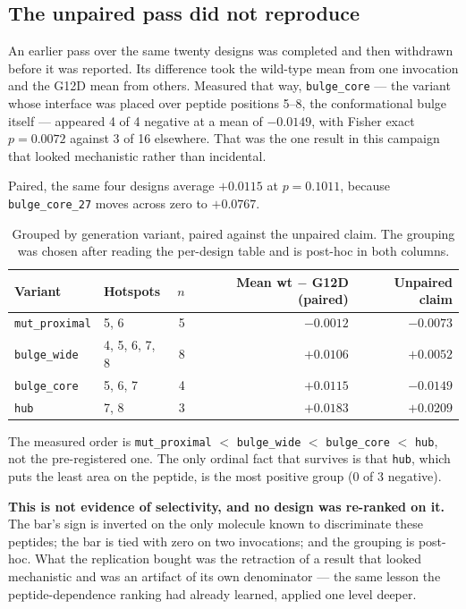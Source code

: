 \documentclass[11pt,a4paper]{article}
\begin{document}
\subsection*{The unpaired pass did not reproduce}

An earlier pass over the same twenty designs was completed and then withdrawn before it was
reported. Its difference took the wild-type mean from one invocation and the G12D mean from
others. Measured that way, \texttt{bulge\_core} --- the variant whose interface was placed over
peptide positions 5--8, the conformational bulge itself --- appeared 4 of 4 negative at a mean of
$-0.0149$, with Fisher exact $p = 0.0072$ against 3 of 16 elsewhere. That was the one result in
this campaign that looked mechanistic rather than incidental.

Paired, the same four designs average $+0.0115$ at $p = 0.1011$, because \texttt{bulge\_core\_27}
moves across zero to $+0.0767$.

\begin{table}[h]
\centering
\caption{Grouped by generation variant, paired against the unpaired claim. The grouping was
chosen after reading the per-design table and is post-hoc in both columns.}
\small
\begin{tabular}{llrrr}
\toprule
Variant & Hotspots & $n$ & Mean wt $-$ G12D (paired) & Unpaired claim \\
\midrule
\texttt{mut\_proximal} & 5, 6 & 5 & $-0.0012$ & $-0.0073$ \\
\texttt{bulge\_wide} & 4, 5, 6, 7, 8 & 8 & $+0.0106$ & $+0.0052$ \\
\texttt{bulge\_core} & 5, 6, 7 & 4 & $\mathbf{+0.0115}$ & $\mathbf{-0.0149}$ \\
\texttt{hub} & 7, 8 & 3 & $+0.0183$ & $+0.0209$ \\
\bottomrule
\end{tabular}
\end{table}

The measured order is \texttt{mut\_proximal} $<$ \texttt{bulge\_wide} $<$ \texttt{bulge\_core}
$<$ \texttt{hub}, not the pre-registered one. The only ordinal fact that survives is that
\texttt{hub}, which puts the least area on the peptide, is the most positive group (0 of 3
negative).

\textbf{This is not evidence of selectivity, and no design was re-ranked on it.} The bar's sign
is inverted on the only molecule known to discriminate these peptides; the bar is tied with zero
on two invocations; and the grouping is post-hoc. What the replication bought was the retraction
of a result that looked mechanistic and was an artifact of its own denominator --- the same
lesson the peptide-dependence ranking had already learned, applied one level deeper.
\end{document}

